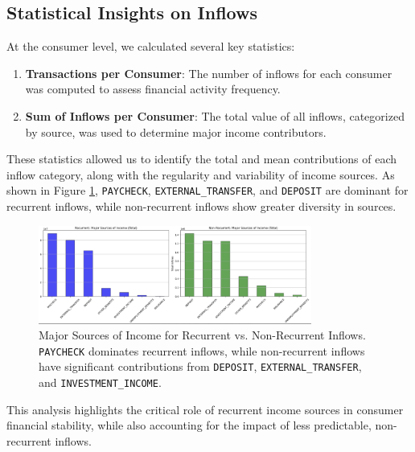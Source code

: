 \documentclass[12pt,letterpaper]{article}
\begin{document}
\subsection{Statistical Insights on Inflows}
At the consumer level, we calculated several key statistics:
\begin{enumerate}
    \item \textbf{Transactions per Consumer}: The number of inflows for each consumer was computed to assess financial activity frequency.
    \item \textbf{Sum of Inflows per Consumer}: The total value of all inflows, categorized by source, was used to determine major income contributors.
\end{enumerate}

These statistics allowed us to identify the total and mean contributions of each inflow category, along with the regularity and variability of income sources. As shown in Figure \ref{fig:recurrent_vs_non_recurrent}, \texttt{PAYCHECK}, \texttt{EXTERNAL\_TRANSFER}, and \texttt{DEPOSIT} are dominant for recurrent inflows, while non-recurrent inflows show greater diversity in sources.

\begin{figure}[H]
    \centering
    \includegraphics[width=0.8\textwidth]{figure/recurrent_vs_non_recurrent}
    \caption{Major Sources of Income for Recurrent vs. Non-Recurrent Inflows. \texttt{PAYCHECK} dominates recurrent inflows, while non-recurrent inflows have significant contributions from \texttt{DEPOSIT}, \texttt{EXTERNAL\_TRANSFER}, and \texttt{INVESTMENT\_INCOME}.}
    \label{fig:recurrent_vs_non_recurrent}
\end{figure}

This analysis highlights the critical role of recurrent income sources in consumer financial stability, while also accounting for the impact of less predictable, non-recurrent inflows.


\end{document}
